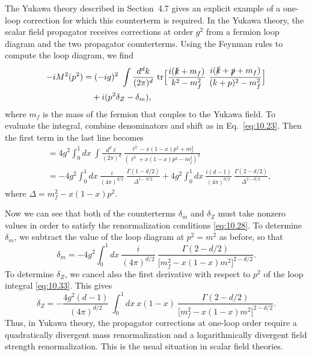 The Yukawa theory described in Section~4.7 gives an explicit example of a
one-loop correction for which this counterterm is required.  In the Yukawa
theory, the scalar field propagator receives corrections at order $g^2$ from a
fermion loop diagram and the two propagator counterterms.  Using the Feynman
rules to compute the loop diagram, we find
\begin{equation}
  \begin{aligned}
    -iM^2(p^2) &= (-ig)^2\ \int \frac{d^dk}{(2\pi)^d}\ \mathrm{tr}\Bigl[
      \frac{i(\slashed{k}+m_f)}{k^2-m_f^2}\ \frac{i(\slashed{k}+\slashed{p}
        +m_f)}{(k+p)^2-m_f^2} \Bigr]\\
    &\quad + i(p^2\delta_Z - \delta_m) ,
  \end{aligned}
  \label{eq:10.32}
\end{equation}
where $m_f$ is the mass of the fermion that couples to the Yukawa field.  To
evaluate the integral, combine denominators and shift as in Eq.~\eqref{eq:10.23}.
Then the first term in the last line becomes
\begin{equation}
  \begin{aligned}
    &= 4g^2\int_0^1 dx\ \int \frac{d^d\ell}{(2\pi)^d}\
      \frac{\ell^2 - x(1-x)p^2 + m_f^2}{(\ell^2 + x(1-x)p^2 - m_f^2)^2}\\
    &= -4g^2\int_0^1 dx\ \frac{i}{(4\pi)^{d/2}}\ \frac{\Gamma(1-d/2)}
      {\Delta^{1-d/2}} + 4g^2\int_0^1 dx\ \frac{i(d-1)}{(4\pi)^{d/2}}\
      \frac{\Gamma(2-d/2)}{\Delta^{2-d/2}} ,
  \end{aligned}
  \label{eq:10.33}
\end{equation}
where $\Delta = m_f^2 - x(1-x)p^2$.

Now we can see that both of the counterterms $\delta_m$ and $\delta_Z$ must
take nonzero values in order to satisfy the renormalization conditions
\eqref{eq:10.28}.  To determine $\delta_m$, we subtract the value of the loop
diagram at $p^2 = m^2$ as before, so that
\begin{equation}
  \delta_m = -4g^2\int_0^1 dx\ \frac{i}{(4\pi)^{d/2}}\ \frac{\Gamma(2-d/2)}
    {\bigl[ m_f^2 - x(1-x)m^2 \bigr]^{2-d/2}} .
  \label{eq:10.34}
\end{equation}
To determine $\delta_Z$, we cancel also the first derivative with respect to
$p^2$ of the loop integral \eqref{eq:10.33}.  This gives
\begin{equation}
  \delta_Z = -\frac{4g^2(d-1)}{(4\pi)^{d/2}}\ \int_0^1 dx\ x(1-x)\
    \frac{\Gamma(2-d/2)}{\bigl[ m_f^2 - x(1-x)m^2 \bigr]^{2-d/2}} .
  \label{eq:10.35}
\end{equation}
Thus, in Yukawa theory, the propagator corrections at one-loop order require a
quadratically divergent mass renormalization and a logarithmically divergent
field strength renormalization.  This is the usual situation in scalar field
theories.

